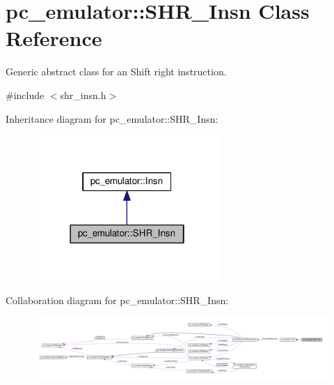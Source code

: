 \hypertarget{classpc__emulator_1_1SHR__Insn}{}\section{pc\+\_\+emulator\+:\+:S\+H\+R\+\_\+\+Insn Class Reference}
\label{classpc__emulator_1_1SHR__Insn}


Generic abstract class for an Shift right instruction.  




{\ttfamily \#include $<$shr\+\_\+insn.\+h$>$}



Inheritance diagram for pc\+\_\+emulator\+:\+:S\+H\+R\+\_\+\+Insn\+:
\nopagebreak
\begin{figure}[H]
\begin{center}
\leavevmode
\includegraphics[width=202pt]{classpc__emulator_1_1SHR__Insn__inherit__graph}
\end{center}
\end{figure}


Collaboration diagram for pc\+\_\+emulator\+:\+:S\+H\+R\+\_\+\+Insn\+:
\nopagebreak
\begin{figure}[H]
\begin{center}
\leavevmode
\includegraphics[width=350pt]{classpc__emulator_1_1SHR__Insn__coll__graph}
\end{center}
\end{figure}
